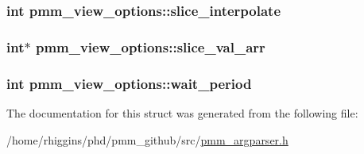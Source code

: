 \hypertarget{structpmm__view__options_af498f394b649d03ad9921b0b60d52f5f}{
\subsubsection[{slice\-\_\-interpolate}]{\setlength{\rightskip}{0pt plus 5cm}int pmm\-\_\-view\-\_\-options\-::slice\-\_\-interpolate}}\label{structpmm__view__options_af498f394b649d03ad9921b0b60d52f5f}
\hypertarget{structpmm__view__options_a5ccace893d361181b411813fa571cae2}{
\subsubsection[{slice\-\_\-val\-\_\-arr}]{\setlength{\rightskip}{0pt plus 5cm}int$\ast$ pmm\-\_\-view\-\_\-options\-::slice\-\_\-val\-\_\-arr}}\label{structpmm__view__options_a5ccace893d361181b411813fa571cae2}
\hypertarget{structpmm__view__options_afe6ee5c0574574901ddd99d2e46ba967}{
\subsubsection[{wait\-\_\-period}]{\setlength{\rightskip}{0pt plus 5cm}int pmm\-\_\-view\-\_\-options\-::wait\-\_\-period}}\label{structpmm__view__options_afe6ee5c0574574901ddd99d2e46ba967}


The documentation for this struct was generated from the following file\-:\begin{DoxyCompactItemize}
\item 
/home/rhiggins/phd/pmm\-\_\-github/src/\hyperlink{pmm__argparser_8h}{pmm\-\_\-argparser.\-h}\end{DoxyCompactItemize}
